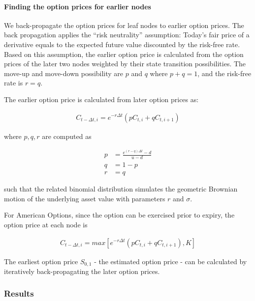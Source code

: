 \paragraph{Finding the option prices for earlier nodes}
We back-propagate the option prices for leaf nodes to earlier option prices.
The back propagation applies the ``risk neutrality'' assumption:
Today's fair price of a derivative equals to the expected future value discounted by the risk-free rate. %
Based on this assumption, the earlier option price is calculated from the option prices of the later two nodes weighted by their state transition possibilities.
The move-up and move-down possibility are $p$ and $q$ where $p + q = 1$, and the risk-free rate is $r = q$.

The earlier option price is calculated from later option prices as:

\begin{align} 
C_{t - \Delta t, i} = e^{-r \Delta t} (p C_{t, i} + q C_{t, i+1})
\end{align}

where $p, q, r$ are computed as

\begin{align} 
p &= \frac{e^{(r-q)\Delta t} - d}{u - d}\\
q &= 1 - p\\
r &= q
\end{align}

such that the related binomial distribution simulates the geometric Brownian motion of the underlying asset value with parameters $r$ and $\sigma$.

For American Options, since the option can be exercised prior to expiry, the option price at each node is

\begin{align}
C_{t - \Delta t, i} = max[e^{-r \Delta t} (p C_{t, i} + q C_{t, i+1}), K]
\end{align}

The earliest option price $S_{0, 1}$ - the estimated option price - can be calculated by iteratively back-propagating the later option prices. 

\subsubsection{Results}

